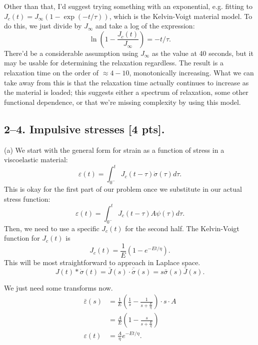 Other than that, I'd suggest trying something with an exponential, e.g. fitting to $J_c(t) = J_\infty(1-\exp(-t/\tau))$, which is the Kelvin-Voigt material model.
 To do this, we just divide by $J_
\infty$ and take a log of the expression:
\begin{equation*}
     \ln \left(1-\frac{J_c(t)}{J_\infty}\right) = -t/\tau.
\end{equation*}
There'd be a considerable assumption using $J_\infty$ as the value at 40 seconds, but it may be usable for determining the relaxation regardless. 
The result is a relaxation time on the order of $\approx 4-10$, monotonically increasing. 
What we can take away from this is that the relaxation time actually continues to increase as the material is loaded; this suggests either a spectrum of relaxation, some other functional dependence, or that we're missing complexity by using this model.

\bigskip
\subsection*{2--4. \textbf{Impulsive stresses} [4 pts].}

(a) We start with the general form for strain as a function of stress in a viscoelastic material:
\begin{equation*}
    \varepsilon(t) = \int_{0^-}^tJ_c(t-\tau) \dot{\sigma}(\tau) d\tau.
\end{equation*}
This is okay for the first part of our problem once we substitute in our actual stress function:
\begin{equation*}
     \varepsilon(t) = \int_{0^-}^tJ_c(t-\tau)  A \psi(\tau) d\tau.
\end{equation*}
Then, we need to use a specific $J_c(t)$ for the second half. 
The Kelvin-Voigt function for $J_c(t)$ is
\begin{equation*}
    J_c(t) = \frac{1}{E} \left( 1 - e^{-Et/\eta}\right).
\end{equation*}
This will be most straightforward to approach in Laplace space.
\begin{equation*}
    J(t)*\dot{\sigma}(t) = \bar{J}(s)\cdot \bar{\dot{\sigma}}(s) =  s\bar{{\sigma}}(s)\bar{J}(s).
\end{equation*}

We just need some transforms now.
\begin{align*}
    \bar{\varepsilon}(s) &= \frac{1}{E} \left( \frac{1}{s} - \frac{1}{s+\frac{E}{\eta}}\right) \cdot s\cdot A\\
    &= \frac{A}{E}\left( 1 - \frac{s}{s+\frac{E}{\eta}} \right)\\
    \varepsilon(t) &= \frac{A}{\eta} e^{-Et/\eta}.
\end{align*}


